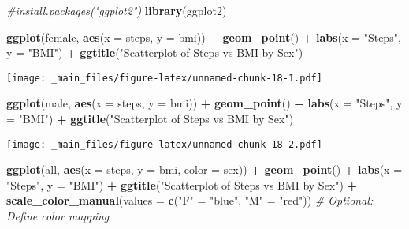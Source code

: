 \documentclass[
]{book}
\newenvironment{Shaded}{\begin{snugshade}}{\end{snugshade}}
\newcommand{\AttributeTok}[1]{\textcolor[rgb]{0.13,0.29,0.53}{#1}}
\newcommand{\CommentTok}[1]{\textcolor[rgb]{0.56,0.35,0.01}{\textit{#1}}}
\newcommand{\FunctionTok}[1]{\textcolor[rgb]{0.13,0.29,0.53}{\textbf{#1}}}
\newcommand{\NormalTok}[1]{#1}
\newcommand{\OtherTok}[1]{\textcolor[rgb]{0.56,0.35,0.01}{#1}}
\newcommand{\SpecialCharTok}[1]{\textcolor[rgb]{0.81,0.36,0.00}{\textbf{#1}}}
\newcommand{\StringTok}[1]{\textcolor[rgb]{0.31,0.60,0.02}{#1}}
\begin{document}
\begin{Shaded}
\begin{Highlighting}[]
\CommentTok{\#install.packages("ggplot2")}
\FunctionTok{library}\NormalTok{(ggplot2)}


\FunctionTok{ggplot}\NormalTok{(female, }\FunctionTok{aes}\NormalTok{(}\AttributeTok{x =}\NormalTok{ steps, }\AttributeTok{y =}\NormalTok{ bmi)) }\SpecialCharTok{+}
  \FunctionTok{geom\_point}\NormalTok{() }\SpecialCharTok{+}
  \FunctionTok{labs}\NormalTok{(}\AttributeTok{x =} \StringTok{"Steps"}\NormalTok{, }\AttributeTok{y =} \StringTok{"BMI"}\NormalTok{) }\SpecialCharTok{+}
  \FunctionTok{ggtitle}\NormalTok{(}\StringTok{"Scatterplot of Steps vs BMI by Sex"}\NormalTok{) }
\end{Highlighting}
\end{Shaded}

\texttt{[image: \_main\_files/figure-latex/unnamed-chunk-18-1.pdf]}

\begin{Shaded}
\begin{Highlighting}[]
\FunctionTok{ggplot}\NormalTok{(male, }\FunctionTok{aes}\NormalTok{(}\AttributeTok{x =}\NormalTok{ steps, }\AttributeTok{y =}\NormalTok{ bmi)) }\SpecialCharTok{+}
  \FunctionTok{geom\_point}\NormalTok{() }\SpecialCharTok{+}
  \FunctionTok{labs}\NormalTok{(}\AttributeTok{x =} \StringTok{"Steps"}\NormalTok{, }\AttributeTok{y =} \StringTok{"BMI"}\NormalTok{) }\SpecialCharTok{+}
  \FunctionTok{ggtitle}\NormalTok{(}\StringTok{"Scatterplot of Steps vs BMI by Sex"}\NormalTok{) }
\end{Highlighting}
\end{Shaded}

\texttt{[image: \_main\_files/figure-latex/unnamed-chunk-18-2.pdf]}

\begin{Shaded}
\begin{Highlighting}[]
\FunctionTok{ggplot}\NormalTok{(all, }\FunctionTok{aes}\NormalTok{(}\AttributeTok{x =}\NormalTok{ steps, }\AttributeTok{y =}\NormalTok{ bmi, }\AttributeTok{color =}\NormalTok{ sex)) }\SpecialCharTok{+}
  \FunctionTok{geom\_point}\NormalTok{() }\SpecialCharTok{+}
  \FunctionTok{labs}\NormalTok{(}\AttributeTok{x =} \StringTok{"Steps"}\NormalTok{, }\AttributeTok{y =} \StringTok{"BMI"}\NormalTok{) }\SpecialCharTok{+}
  \FunctionTok{ggtitle}\NormalTok{(}\StringTok{"Scatterplot of Steps vs BMI by Sex"}\NormalTok{) }\SpecialCharTok{+}
  \FunctionTok{scale\_color\_manual}\NormalTok{(}\AttributeTok{values =} \FunctionTok{c}\NormalTok{(}\StringTok{"F"} \OtherTok{=} \StringTok{"blue"}\NormalTok{, }\StringTok{"M"} \OtherTok{=} \StringTok{"red"}\NormalTok{))  }\CommentTok{\# Optional: Define color mapping}
\end{Highlighting}
\end{Shaded}
\end{document}
